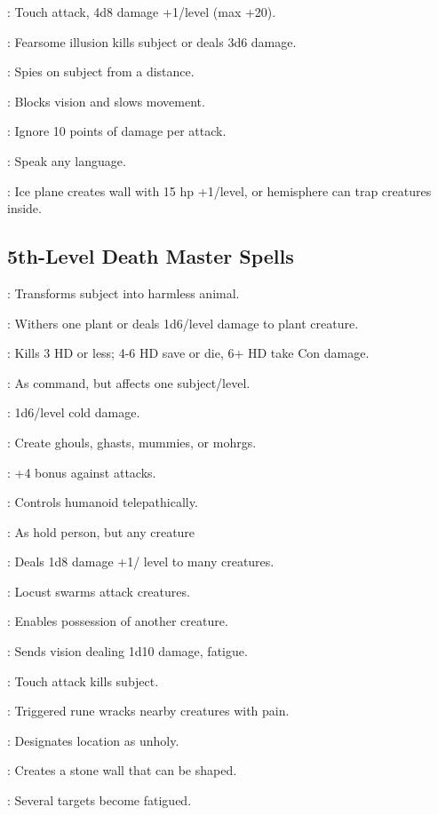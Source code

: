 \begin{multicols}{2}
\begin{description*}
\item[\linkspell{Inflict Critical Wounds}:] Touch attack, 4d8 damage +1/level (max +20).
\item[\linkspell{Phantasmal Killer}:] Fearsome illusion kills subject or deals 3d6 damage.
\item[\linkspell{Scrying}:] Spies on subject from a distance.
\item[\linkspell{Solid Fog}:] Blocks vision and slows movement.
\item[\linkspell{Stoneskin}:] Ignore 10 points of damage per attack.
\item[\linkspell{Tongues}:] Speak any language.
\item[\linkspell{Wall of Ice}:] Ice plane creates wall with 15 hp +1/level, or hemisphere can trap creatures inside.
\end{description*}

\subsection{5th-Level Death Master Spells}
\begin{description*}
\item[\linkspell{Baleful Polymorph}:] Transforms subject into harmless animal.
\item[\linkspell{Blight}:] Withers one plant or deals 1d6/level damage to plant creature.
\item[\linkspell{Cloudkill}:] Kills 3 HD or less; 4-6 HD save or die, 6+ HD take Con damage.
\item[\linkspell{Command, Greater}:] As command, but affects one subject/level.
\item[\linkspell{Cone of Cold}:] 1d6/level cold damage.
\item[\linkspell{Create Undead}:] Create ghouls, ghasts, mummies, or mohrgs.
\item[\linkspell{Dispel Good}:] +4 bonus against attacks.
\item[\linkspell{Dominate Person}:] Controls humanoid telepathically.
\item[\linkspell{Hold Monster}:] As hold person, but any creature
\item[\linkspell{Inflict Light Wounds, Mass}:] Deals 1d8 damage +1/ level to many creatures.
\item[\linkspell{Insect Plague}:] Locust swarms attack creatures.
\item[\linkspell{Magic Jar}:] Enables possession of another creature.
\item[\linkspell{Nightmare}:] Sends vision dealing 1d10 damage, fatigue.
\item[\linkspell{Slay Living}:] Touch attack kills subject.
\item[\linkspell{Symbol of Pain}:] Triggered rune wracks nearby creatures with pain.
\item[\linkspell{Unhallow}:] Designates location as unholy.
\item[\linkspell{Wall of Stone}:] Creates a stone wall that can be shaped.
\item[\linkspell{Waves of Fatigue}:] Several targets become fatigued.
\end{description*}


\end{multicols}
